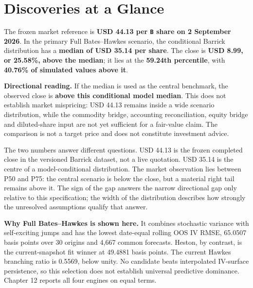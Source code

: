 \chapter*{Discoveries at a Glance}

\begin{tcolorbox}[
  title={Discovery 1: current market reference and primary conditional signal},
  colback=sflightblue,
  colframe=sfblue,
  boxrule=0.7pt,
  arc=1mm,
  left=3mm,
  right=3mm
]
\small
The frozen market reference is \textbf{USD 44.13 per \texttt{B} share on
2 September 2026}. In the primary Full Bates--Hawkes scenario, the conditional
Barrick distribution has a \textbf{median of USD 35.14 per share}. The close is
\textbf{USD 8.99, or 25.58\%, above the median}; it lies at the
\textbf{59.24th percentile}, with \textbf{40.76\% of simulated values above it}.

\medskip
\textbf{Directional reading.} If the median is used as the central benchmark,
the observed close is \textbf{above this conditional model median}. This does
not establish market mispricing:
USD 44.13 remains inside a wide scenario distribution, while the commodity
bridge, accounting reconciliation, equity bridge and diluted-share input are
not yet sufficient for a fair-value claim. The comparison is not a target
price and does not constitute investment advice.
\end{tcolorbox}

The two numbers answer different questions. USD 44.13 is the frozen
completed close in the versioned Barrick dataset, not a live quotation. USD 35.14
is the centre of a model-conditional distribution. The market observation lies
between P50 and P75: the central scenario is below the close, but a material
right tail remains above it. The sign of the gap answers the narrow
directional gap only relative to this specification;
the width of the distribution describes how strongly the unresolved
assumptions qualify that answer.

\noindent\textbf{Why Full Bates--Hawkes is shown here.} It combines stochastic
variance with self-exciting jumps and has the lowest date-equal rolling OOS
IV RMSE, 65.0507 basis points over 30 origins and 4,667 common forecasts.
Heston, by contrast, is the current-snapshot fit winner at 49.4881 basis points.
The current Hawkes branching ratio is 0.5569, below unity. No candidate beats
interpolated IV-surface persistence, so this selection does not establish
universal predictive dominance. Chapter 12 reports all four engines on equal terms.

